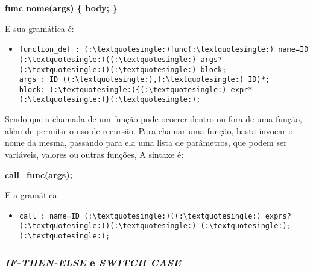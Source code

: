             \textbf{func nome(args) \{
                body;
            \}}

            E sua gramática é:
            \begin{itemize}
            \item[ ]
            \begin{lstlisting}
function_def : (:\textquotesingle:)func(:\textquotesingle:) name=ID (:\textquotesingle:)((:\textquotesingle:) args? (:\textquotesingle:))(:\textquotesingle:) block;
args : ID ((:\textquotesingle:),(:\textquotesingle:) ID)*;
block: (:\textquotesingle:){(:\textquotesingle:) expr* (:\textquotesingle:)}(:\textquotesingle:);            
            \end{lstlisting}
            \end{itemize}

            Sendo que a chamada de um função pode ocorrer dentro ou fora de uma função, além de permitir o uso de recursão. Para chamar uma função, basta invocar o nome da mesma, passando para ela uma lista de parâmetros, que podem ser variáveis, valores ou outras funções, A sintaxe é:

            \textbf{call\_func(args);}

            E a gramática:
			\begin{itemize}
				\item[ ]
				
    			   \begin{lstlisting}
call : name=ID (:\textquotesingle:)((:\textquotesingle:) exprs? (:\textquotesingle:))(:\textquotesingle:) (:\textquotesingle:);(:\textquotesingle:);            
	           \end{lstlisting}

			\end{itemize}
			
		\subsubsection{\normalsize \textit{IF-THEN-ELSE} e \textit{SWITCH CASE}}
        
